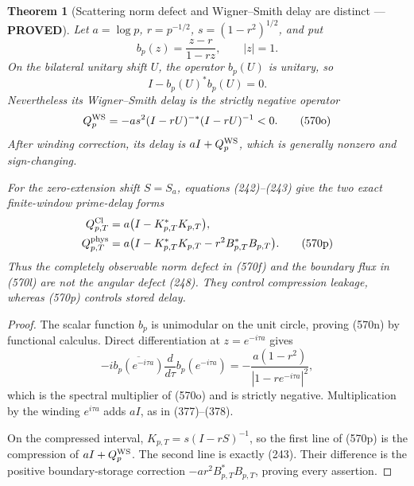 \documentclass[11pt]{article}
\newtheorem{theorem}{Theorem}
\newcommand{\PROVED}{\textcolor{green!45!black}{\textbf{PROVED}}}
\begin{document}
\begin{theorem}[Scattering norm defect and Wigner--Smith delay are distinct
--- \PROVED]
Let \(a=\log p\), \(r=p^{-1/2}\), \(s=(1-r^2)^{1/2}\), and put
\[
 b_p(z)=\frac{z-r}{1-rz},\qquad |z|=1.
\]
On the bilateral unitary shift \(U\), the operator \(b_p(U)\) is unitary,
so
\begin{equation}
 I-b_p(U)^*b_p(U)=0.                                 \tag{570n}
\end{equation}
Nevertheless its Wigner--Smith delay is the strictly negative operator
\begin{equation}
 Q_p^{\rm WS}
 =-a s^2(I-rU)^{-*}(I-rU)^{-1}<0.                   \tag{570o}
\end{equation}
After winding correction, its delay is
\(aI+Q_p^{\rm WS}\), which is generally nonzero and sign-changing.

For the zero-extension shift \(S=S_a\), equations (242)--(243) give the
two exact finite-window prime-delay forms
\begin{align}
 Q_{p,T}^{\rm Cl}
 &=a\bigl(I-K_{p,T}^*K_{p,T}\bigr),\notag\\
 Q_{p,T}^{\rm phys}
 &=a\bigl(I-K_{p,T}^*K_{p,T}
              -r^2B_{p,T}^*B_{p,T}\bigr).           \tag{570p}
\end{align}
Thus the completely observable norm defect in (570f) and the boundary flux
in (570l) are not the angular defect (248).  They control compression
leakage, whereas (570p) controls stored delay.
\end{theorem}

\begin{proof}
The scalar function \(b_p\) is unimodular on the unit circle, proving
(570n) by functional calculus.  Direct differentiation at
\(z=e^{-i\tau a}\) gives
\[
 -i\overline{b_p(e^{-i\tau a})}
       \frac d{d\tau}b_p(e^{-i\tau a})
 =-\frac{a(1-r^2)}{|1-re^{-i\tau a}|^2},
\]
which is the spectral multiplier of (570o) and is strictly negative.
Multiplication by the winding \(e^{i\tau a}\) adds \(aI\), as in
(377)--(378).

On the compressed interval,
\(K_{p,T}=s(I-rS)^{-1}\), so the first line of (570p) is the compression
of \(aI+Q_p^{\rm WS}\).  The second line is exactly (243).  Their
difference is the positive boundary-storage correction
\(-ar^2B_{p,T}^*B_{p,T}\), proving every assertion.
\end{proof}
\end{document}
